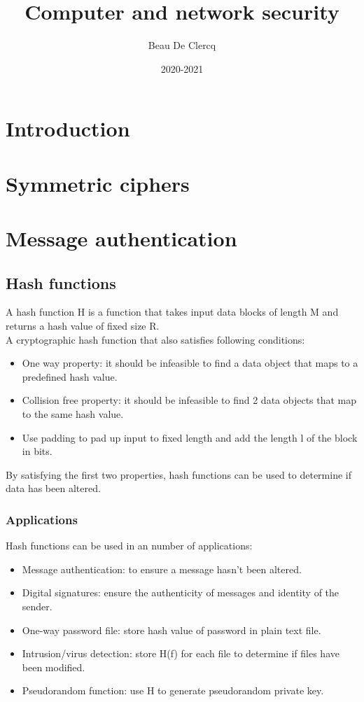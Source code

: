 \documentclass[12pt]{article}
\title{Computer and network security}
\author{Beau De Clercq}
\date{2020-2021}
\begin{document}
	
 \maketitle{}
 
 \tableofcontents
 
 \clearpage
 \newpage
 
 \section{Introduction}
 
 \section{Symmetric ciphers}
 
 \section{Message authentication}
 \subsection{Hash functions}
 A hash function H is a function that takes input data blocks of length M and returns a hash value of fixed size R.\\
 A cryptographic hash function that also satisfies following conditions:
 \begin{itemize}
 	\item One way property: it should be infeasible to find a data object that maps to a predefined hash value.
 	\item Collision free property: it should be infeasible to find 2 data objects that map to the same hash value.
 	\item Use padding to pad up input to fixed length and add the length l of the block in bits. 
 \end{itemize}
By satisfying the first two properties, hash functions can  be used to determine if data has been altered.
\subsubsection{Applications}
Hash functions can be used in an number of applications:
\begin{itemize}
	\item Message authentication: to ensure a message hasn't been altered.
	\item Digital signatures: ensure the authenticity of messages and identity of the sender.
	\item One-way password file: store hash value of password in plain text file.
	\item Intrusion/virus detection: store H(f) for each file to determine if files have been modified.
	\item Pseudorandom function: use H to generate pseudorandom private key.
\end{itemize}
\end{document}
